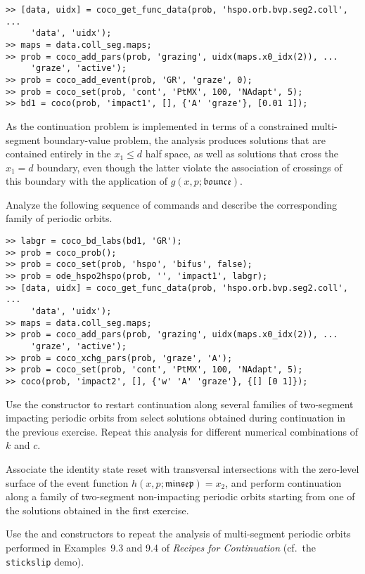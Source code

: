 \begin{lstlisting}[language=coco-highlight]
>> [data, uidx] = coco_get_func_data(prob, 'hspo.orb.bvp.seg2.coll', ...
     'data', 'uidx');
>> maps = data.coll_seg.maps;
>> prob = coco_add_pars(prob, 'grazing', uidx(maps.x0_idx(2)), ...
     'graze', 'active');
>> prob = coco_add_event(prob, 'GR', 'graze', 0);
>> prob = coco_set(prob, 'cont', 'PtMX', 100, 'NAdapt', 5);
>> bd1 = coco(prob, 'impact1', [], {'A' 'graze'}, [0.01 1]);
\end{lstlisting}
As the continuation problem is implemented in terms of a constrained multi-segment boundary-value problem, the analysis produces solutions that are contained entirely in the $x_1\le d$ half space, as well as solutions that cross the $x_1=d$ boundary, even though the latter violate the association of crossings of this boundary with the application of $g(x,p;\mathfrak{bounce})$.\\
\medskip

\begin{exercises}

\item Analyze the following sequence of commands and describe the corresponding family of periodic orbits.
\begin{lstlisting}[language=coco-highlight]
>> labgr = coco_bd_labs(bd1, 'GR');
>> prob = coco_prob();
>> prob = coco_set(prob, 'hspo', 'bifus', false);
>> prob = ode_hspo2hspo(prob, '', 'impact1', labgr);
>> [data, uidx] = coco_get_func_data(prob, 'hspo.orb.bvp.seg2.coll', ...
     'data', 'uidx');
>> maps = data.coll_seg.maps;
>> prob = coco_add_pars(prob, 'grazing', uidx(maps.x0_idx(2)), ...
     'graze', 'active');
>> prob = coco_xchg_pars(prob, 'graze', 'A');
>> prob = coco_set(prob, 'cont', 'PtMX', 100, 'NAdapt', 5);
>> coco(prob, 'impact2', [], {'w' 'A' 'graze'}, {[] [0 1]});
\end{lstlisting}

\item Use the  constructor to restart continuation along several families of two-segment impacting periodic orbits from select solutions obtained during continuation in the previous exercise. Repeat this analysis for different numerical combinations of $k$ and $c$.

\item Associate the identity state reset with transversal intersections with the zero-level surface of the event function $h(x,p;\mathfrak{minsep})=x_2$, and perform continuation along a family of two-segment non-impacting periodic orbits starting from one of the solutions obtained in the first exercise.

\item Use the  and  constructors to repeat the analysis of multi-segment periodic orbits performed in Examples~9.3 and 9.4 of \emph{Recipes for Continuation} (cf.~the \texttt{stickslip} demo).

\end{exercises}

